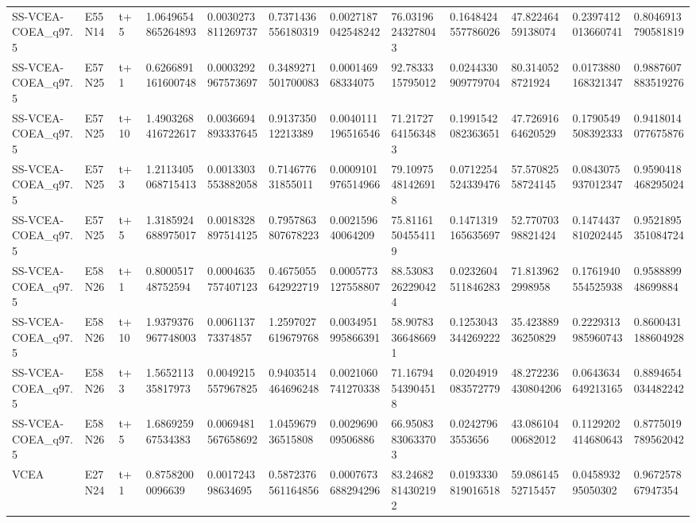 \begin{landscape}
\begin{longtable}{llllllllllll}
SS-VCEA-COEA\_q97.5 & E55N14 & t+5 & 1.0649654865264893 & 0.0030273811269737 & 0.7371436556180319 & 0.0027187042548242 & 76.03196243278043 & 0.1648424557786026 & 47.82246459138074 & 0.2397412013660741 & 0.8046913790581819 \\
SS-VCEA-COEA\_q97.5 & E57N25 & t+1 & 0.6266891161600748 & 0.0003292967573697 & 0.3489271501700083 & 0.000146968334075 & 92.7833315795012 & 0.0244330909779704 & 80.3140528721924 & 0.0173880168321347 & 0.9887607883519276 \\
SS-VCEA-COEA\_q97.5 & E57N25 & t+10 & 1.4903268416722617 & 0.0036694893337645 & 0.913735012213389 & 0.0040111196516546 & 71.21727641563483 & 0.1991542082363651 & 47.72691664620529 & 0.1790549508392333 & 0.9418014077675876 \\
SS-VCEA-COEA\_q97.5 & E57N25 & t+3 & 1.2113405068715413 & 0.0013303553882058 & 0.714677631855011 & 0.0009101976514966 & 79.10975481426918 & 0.0712254524339476 & 57.57082558724145 & 0.0843075937012347 & 0.9590418468295024 \\
SS-VCEA-COEA\_q97.5 & E57N25 & t+5 & 1.3185924688975017 & 0.0018328897514125 & 0.7957863807678223 & 0.002159640064209 & 75.81161504554119 & 0.1471319165635697 & 52.77070398821424 & 0.1474437810202445 & 0.9521895351084724 \\
SS-VCEA-COEA\_q97.5 & E58N26 & t+1 & 0.800051748752594 & 0.0004635757407123 & 0.4675055642922719 & 0.0005773127558807 & 88.53083262290424 & 0.0232604511846283 & 71.8139622998958 & 0.1761940554525938 & 0.958889948699884 \\
SS-VCEA-COEA\_q97.5 & E58N26 & t+10 & 1.9379376967748003 & 0.006113773374857 & 1.2597027619679768 & 0.0034951995866391 & 58.90783366486691 & 0.1253043344269222 & 35.42388936250829 & 0.2229313985960743 & 0.8600431188604928 \\
SS-VCEA-COEA\_q97.5 & E58N26 & t+3 & 1.565211335817973 & 0.0049215557967825 & 0.9403514464696248 & 0.0021060741270338 & 71.16794543904518 & 0.0204919083572779 & 48.272236430804206 & 0.0643634649213165 & 0.8894654034482242 \\
SS-VCEA-COEA\_q97.5 & E58N26 & t+5 & 1.686925967534383 & 0.0069481567658692 & 1.045967936515808 & 0.002969009506886 & 66.95083830633703 & 0.02427963553656 & 43.08610400682012 & 0.1129202414680643 & 0.8775019789562042 \\
VCEA & E27N24 & t+1 & 0.87582000096639 & 0.001724398634695 & 0.5872376561164856 & 0.0007673688294296 & 83.24682814302192 & 0.0193330819016518 & 59.08614552715457 & 0.045893295050302 & 0.967257867947354 \\

\end{longtable}
\end{landscape}
